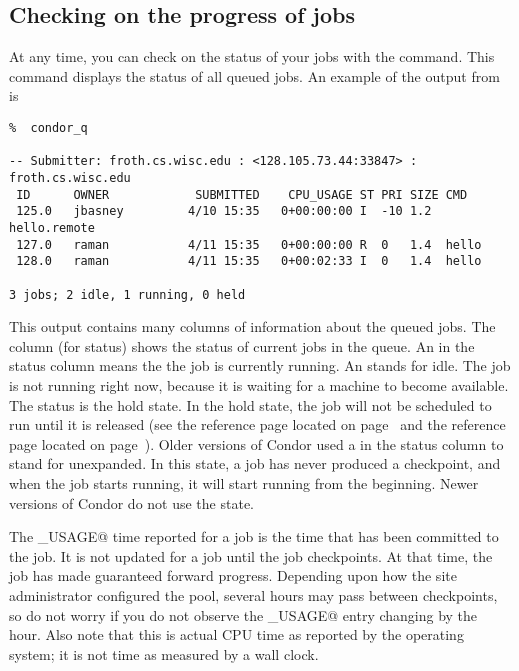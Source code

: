 \subsection{Checking on the progress of jobs}
At any time, you can check on the status of your jobs with the 
command.
This command displays the status of all queued jobs.
An example of the output from  is
\footnotesize
\begin{verbatim}
%  condor_q

-- Submitter: froth.cs.wisc.edu : <128.105.73.44:33847> : froth.cs.wisc.edu
 ID      OWNER            SUBMITTED    CPU_USAGE ST PRI SIZE CMD               
 125.0   jbasney         4/10 15:35   0+00:00:00 I  -10 1.2  hello.remote      
 127.0   raman           4/11 15:35   0+00:00:00 R  0   1.4  hello             
 128.0   raman           4/11 15:35   0+00:02:33 I  0   1.4  hello             

3 jobs; 2 idle, 1 running, 0 held

\end{verbatim} 
\normalsize
This output contains many columns of information about the
queued jobs.
The \verb@ST@ column (for status) shows the status of
current jobs in the queue. An \verb@R@ in the status column
means the the job is currently running.
An \verb@I@ stands for idle. 
The job is not running right
now, because it is waiting for a machine to become available. 
The status
\verb@H@ is the hold state. In the hold state,
the job will not be scheduled to
run until it is released (see the 
reference page located on page~\pageref{man-condor-hold}
and the 
reference page located on page~\pageref{man-condor-release}).
Older versions of Condor used a
\verb@U@ in the status column to stand for unexpanded.
In this state,
a job has never 
produced a checkpoint,
and when the job starts running, it will start running from the
beginning.
Newer versions of Condor do not use the \verb@U@ state.

The \verb@CPU_USAGE@ time reported for a job is the time that has been
committed to the job.  It is not updated for a job until
the job checkpoints. At that time, the job has made guaranteed forward 
progress.  Depending upon how the site administrator configured the pool,
several hours may pass between checkpoints, so do not worry if you do
not observe the \verb@CPU_USAGE@ entry changing by the hour.
Also note that this is actual CPU
time as reported by the operating system; it is not time as
measured by a wall clock.

